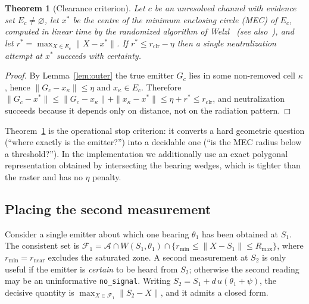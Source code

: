 \documentclass[preprint,12pt,3p]{elsarticle}
\newtheorem{theorem}{Theorem}
\theoremstyle{definition}
\newcommand{\Rmax}{R_{\max}}
\newcommand{\bA}{\mathcal{A}}
\newcommand{\bF}{\mathcal{F}}
\begin{document}
\begin{theorem}[Clearance criterion]
\label{thm:clear}
Let $c$ be an unresolved channel with evidence set $E_c\ne\varnothing$, let $x^\ast$ be the
centre of the minimum enclosing circle (MEC) of $E_c$, computed in linear time by the randomized
algorithm of Welzl~\cite{welzl1991} (see also~\cite{megiddo1983}), and let
$r^\ast=\max_{X\in E_c}\|X-x^\ast\|$. If $r^\ast\le r_{\mathrm{clr}}-\eta$ then a single
neutralization attempt at $x^\ast$ succeeds with certainty.
\end{theorem}
\begin{proof}
By Lemma~\ref{lem:outer} the true emitter $G_c$ lies in some non-removed cell $\kappa$, hence
$\|G_c-x_\kappa\|\le\eta$ and $x_\kappa\in E_c$. Therefore
$\|G_c-x^\ast\|\le\|G_c-x_\kappa\|+\|x_\kappa-x^\ast\|\le\eta+r^\ast\le r_{\mathrm{clr}}$, and
neutralization succeeds because it depends only on distance, not on the radiation pattern.
\end{proof}

Theorem~\ref{thm:clear} is the operational stop criterion: it converts a hard geometric question
(``where exactly is the emitter?'') into a decidable one (``is the MEC radius below a threshold?'').
In the implementation we additionally use an exact polygonal representation obtained by
intersecting the bearing wedges, which is tighter than the raster and has no $\eta$ penalty.

\subsection{Placing the second measurement}

Consider a single emitter about which one bearing $\theta_1$ has been obtained at $S_1$. The
consistent set is
$\bF_1=\bA\cap W(S_1,\theta_1)\cap\{r_{\min}\le\|X-S_1\|\le\Rmax\}$, where $r_{\min}=r_{\mathrm{near}}$
excludes the saturated zone. A second measurement at $S_2$ is only useful if the emitter is
\emph{certain} to be heard from $S_2$; otherwise the second reading may be an uninformative
\texttt{no\_signal}. Writing $S_2=S_1+d\,u(\theta_1+\psi)$, the decisive quantity is
$\max_{X\in\bF_1}\|S_2-X\|$, and it admits a closed form.
\end{document}
